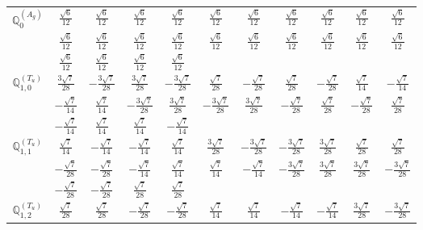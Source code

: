 \documentclass[fleqn,10pt,landscape]{article}
\begin{document}
\begin{itemize}
{\begin{center}
\begin{longtable}{ccccccccccc}
$\mathbb{Q}_{0}^{(A_{g})}$ & $ \frac{\sqrt{6}}{12} $ & $ \frac{\sqrt{6}}{12} $ & $ \frac{\sqrt{6}}{12} $ & $ \frac{\sqrt{6}}{12} $ & $ \frac{\sqrt{6}}{12} $ & $ \frac{\sqrt{6}}{12} $ & $ \frac{\sqrt{6}}{12} $ & $ \frac{\sqrt{6}}{12} $ & $ \frac{\sqrt{6}}{12} $ & $ \frac{\sqrt{6}}{12} $ \\
& $ \frac{\sqrt{6}}{12} $ & $ \frac{\sqrt{6}}{12} $ & $ \frac{\sqrt{6}}{12} $ & $ \frac{\sqrt{6}}{12} $ & $ \frac{\sqrt{6}}{12} $ & $ \frac{\sqrt{6}}{12} $ & $ \frac{\sqrt{6}}{12} $ & $ \frac{\sqrt{6}}{12} $ & $ \frac{\sqrt{6}}{12} $ & $ \frac{\sqrt{6}}{12} $ \\
& $ \frac{\sqrt{6}}{12} $ & $ \frac{\sqrt{6}}{12} $ & $ \frac{\sqrt{6}}{12} $ & $ \frac{\sqrt{6}}{12} $ & $  $ & $  $ & $  $ & $  $ & $  $ & $  $ \\ \hline
$\mathbb{Q}_{1,0}^{(T_{u})}$ & $ \frac{3 \sqrt{7}}{28} $ & $ - \frac{3 \sqrt{7}}{28} $ & $ \frac{3 \sqrt{7}}{28} $ & $ - \frac{3 \sqrt{7}}{28} $ & $ \frac{\sqrt{7}}{28} $ & $ - \frac{\sqrt{7}}{28} $ & $ \frac{\sqrt{7}}{28} $ & $ - \frac{\sqrt{7}}{28} $ & $ \frac{\sqrt{7}}{14} $ & $ - \frac{\sqrt{7}}{14} $ \\
& $ - \frac{\sqrt{7}}{14} $ & $ \frac{\sqrt{7}}{14} $ & $ - \frac{3 \sqrt{7}}{28} $ & $ \frac{3 \sqrt{7}}{28} $ & $ - \frac{3 \sqrt{7}}{28} $ & $ \frac{3 \sqrt{7}}{28} $ & $ - \frac{\sqrt{7}}{28} $ & $ \frac{\sqrt{7}}{28} $ & $ - \frac{\sqrt{7}}{28} $ & $ \frac{\sqrt{7}}{28} $ \\
& $ - \frac{\sqrt{7}}{14} $ & $ \frac{\sqrt{7}}{14} $ & $ \frac{\sqrt{7}}{14} $ & $ - \frac{\sqrt{7}}{14} $ & $  $ & $  $ & $  $ & $  $ & $  $ & $  $ \\ \hline
$\mathbb{Q}_{1,1}^{(T_{u})}$ & $ \frac{\sqrt{7}}{14} $ & $ - \frac{\sqrt{7}}{14} $ & $ - \frac{\sqrt{7}}{14} $ & $ \frac{\sqrt{7}}{14} $ & $ \frac{3 \sqrt{7}}{28} $ & $ - \frac{3 \sqrt{7}}{28} $ & $ - \frac{3 \sqrt{7}}{28} $ & $ \frac{3 \sqrt{7}}{28} $ & $ \frac{\sqrt{7}}{28} $ & $ \frac{\sqrt{7}}{28} $ \\
& $ - \frac{\sqrt{7}}{28} $ & $ - \frac{\sqrt{7}}{28} $ & $ - \frac{\sqrt{7}}{14} $ & $ \frac{\sqrt{7}}{14} $ & $ \frac{\sqrt{7}}{14} $ & $ - \frac{\sqrt{7}}{14} $ & $ - \frac{3 \sqrt{7}}{28} $ & $ \frac{3 \sqrt{7}}{28} $ & $ \frac{3 \sqrt{7}}{28} $ & $ - \frac{3 \sqrt{7}}{28} $ \\
& $ - \frac{\sqrt{7}}{28} $ & $ - \frac{\sqrt{7}}{28} $ & $ \frac{\sqrt{7}}{28} $ & $ \frac{\sqrt{7}}{28} $ & $  $ & $  $ & $  $ & $  $ & $  $ & $  $ \\ \hline
$\mathbb{Q}_{1,2}^{(T_{u})}$ & $ \frac{\sqrt{7}}{28} $ & $ \frac{\sqrt{7}}{28} $ & $ - \frac{\sqrt{7}}{28} $ & $ - \frac{\sqrt{7}}{28} $ & $ \frac{\sqrt{7}}{14} $ & $ \frac{\sqrt{7}}{14} $ & $ - \frac{\sqrt{7}}{14} $ & $ - \frac{\sqrt{7}}{14} $ & $ \frac{3 \sqrt{7}}{28} $ & $ - \frac{3 \sqrt{7}}{28} $ \\

\end{longtable}
\end{center}}
\end{itemize}
\end{document}
